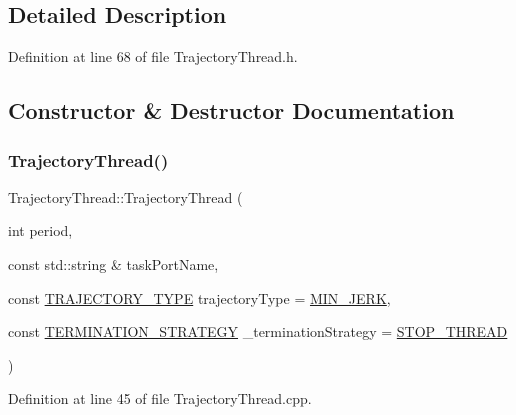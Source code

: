 \subsection{Detailed Description}


Definition at line 68 of file Trajectory\+Thread.\+h.



\subsection{Constructor \& Destructor Documentation}
\hypertarget{classocra__recipes_1_1TrajectoryThread_af85d199a74007110a7654a06f9d3b172}{}\label{classocra__recipes_1_1TrajectoryThread_af85d199a74007110a7654a06f9d3b172} 
\subsubsection{\texorpdfstring{Trajectory\+Thread()}{TrajectoryThread()}\hspace{0.1cm}{\footnotesize\ttfamily [1/3]}}
{\footnotesize\ttfamily Trajectory\+Thread\+::\+Trajectory\+Thread (\begin{DoxyParamCaption}\item[{int}]{period,  }\item[{const std\+::string \&}]{task\+Port\+Name,  }\item[{const \hyperlink{namespaceocra__recipes_a729e1c8304e390d16219eda5f9756152}{T\+R\+A\+J\+E\+C\+T\+O\+R\+Y\+\_\+\+T\+Y\+PE}}]{trajectory\+Type = {\ttfamily \hyperlink{namespaceocra__recipes_a729e1c8304e390d16219eda5f9756152ad90eb95c7a6e37072c38d0f83980bff7}{M\+I\+N\+\_\+\+J\+E\+RK}},  }\item[{const \hyperlink{namespaceocra__recipes_afcf7ca623a6c39b246aa4bda629c7309}{T\+E\+R\+M\+I\+N\+A\+T\+I\+O\+N\+\_\+\+S\+T\+R\+A\+T\+E\+GY}}]{\+\_\+termination\+Strategy = {\ttfamily \hyperlink{namespaceocra__recipes_afcf7ca623a6c39b246aa4bda629c7309a0dc02a3e20f98a401113c91d7e6d4528}{S\+T\+O\+P\+\_\+\+T\+H\+R\+E\+AD}} }\end{DoxyParamCaption})}



Definition at line 45 of file Trajectory\+Thread.\+cpp.

\hypertarget{classocra__recipes_1_1TrajectoryThread_af4c3060ff7bf481ea13b5c81247681d4}{}\label{classocra__recipes_1_1TrajectoryThread_af4c3060ff7bf481ea13b5c81247681d4} 
